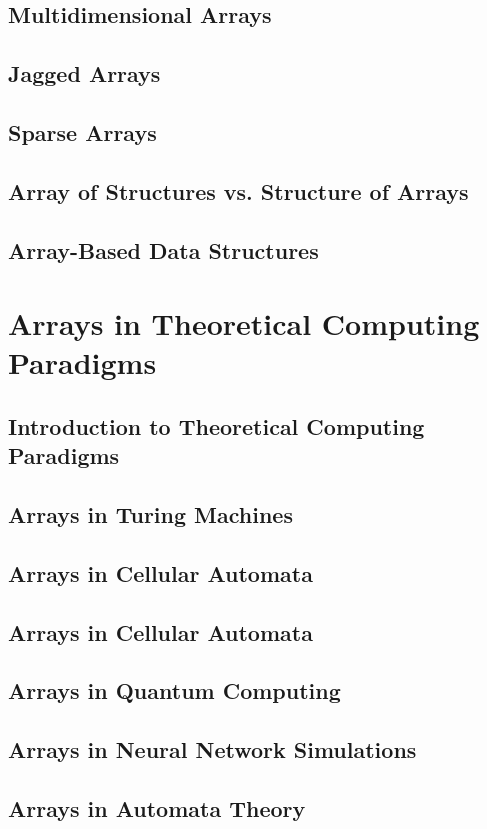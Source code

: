 \documentclass[12pt, oneside]{book}
\begin{document}
	\section{Multidimensional Arrays}
	\section{Jagged Arrays}
	\section{Sparse Arrays}
	\section{Array of Structures vs. Structure of Arrays}
	\section{Array-Based Data Structures}
	
	\chapter{Arrays in Theoretical Computing Paradigms}
	
	\section{Introduction to Theoretical Computing Paradigms}
	\section{Arrays in Turing Machines}
	\section{Arrays in Cellular Automata}
	\section{Arrays in Cellular Automata}
	\section{Arrays in Quantum Computing}
	\section{Arrays in Neural Network Simulations}
	\section{Arrays in Automata Theory}
\end{document}
